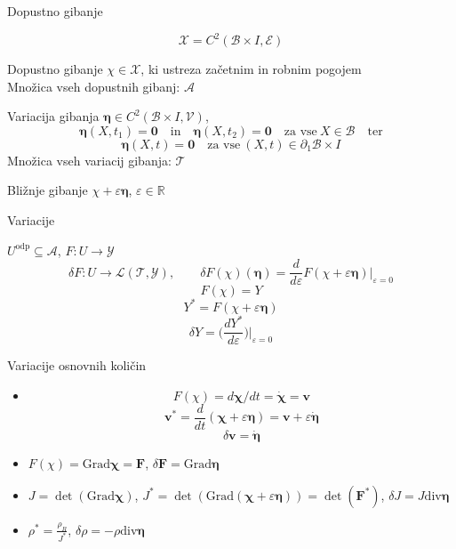 \documentclass{beamer}
\newcommand{\R}{\mathbb R} %
\newcommand{\E}{\mathscr E} %
\newcommand{\V}{\mathscr V} %
\renewcommand{\L}{\mathscr L} %
\newcommand{\B}{\mathcal B} %
\newcommand{\vek}[1]{\boldsymbol #1} %
\newcommand{\ten}[1]{\mathbf #1} %
\renewcommand{\div}{\mathrm{div}} %
\newcommand{\Grad}{\mathrm{Grad}} %
\newcommand{\at}[2]{#1\Big|_{#2}} %
\begin{document}
\begin{frame}{Dopustno gibanje}

\[ \mathcal{X}=C^2(\B\times I,\E) \]
\begin{block}{Dopustno gibanje}
	$\chi\in\mathcal{X}$, ki ustreza začetnim in robnim pogojem\\
	Množica vseh dopustnih gibanj: $\mathcal{A}$
\end{block}

\begin{block}{Variacija gibanja}
	$\vek{\eta}\in C^2(\B\times I,\V)$,
	\[
		\vek{\eta}(X,t_1)=\vek{0}\quad \textrm{in} \quad
		\vek{\eta}(X,t_2)=\vek{0}\quad \textrm{za vse}\ X\in \B\quad\textrm{ter}
	\]
	\[
		\vek{\eta}(X,t)=\vek{0}\quad \textrm{za vse}\ (X,t)\in \partial_1 \B\times I
	\]
	Množica vseh variacij gibanja: $\mathcal{T}$
\end{block}

\begin{block}{Bližnje gibanje}
	$\chi+\varepsilon\vek{\eta}$, $\varepsilon\in\R$
\end{block}

\end{frame}


\begin{frame}{Variacije}

$U^{\mathrm{odp}}\subseteq\mathcal{A}$, $F\colon U\to\mathcal{Y}$
\[
	\delta F\colon U\to\L(\mathcal{T},\mathcal{Y}),\qquad
	\delta F(\chi)(\vek{\eta})=\at{\frac{d}{d\varepsilon}F(\chi+\varepsilon\vek{\eta})}{\varepsilon=0}
\]
\[ F(\chi)=Y \]
\[ Y^*=F(\chi+\varepsilon\vek{\eta}) \]
\[ \delta Y = \at{\Big(\frac{dY^*}{d\varepsilon}\Big)}{\varepsilon=0} \]

\end{frame}


\begin{frame}{Variacije osnovnih količin}

\begin{itemize}

\item
\[ F(\chi)=d\vek{\chi}/dt=\dot{\vek{\chi}}=\vek{v} \]
\[ \vek{v}^*=\frac{d}{dt}(\vek{\chi}+\varepsilon\vek{\eta})=\vek{v}+\varepsilon\dot{\vek{\eta}} \]
\[ \delta\vek{v}=\dot{\vek{\eta}} \]

\item
$F(\chi)=\Grad{\vek{\chi}}=\ten{F}$, $\delta\ten{F}=\Grad\vek{\eta}$

\item
$J=\det(\Grad\vek{\chi})$, $J^*=\det(\Grad(\vek{\chi}+\varepsilon\vek{\eta}))=\det(\ten{F}^*)$,
$\delta J=J\div\vek{\eta}$

\item
$\rho^*=\frac{\rho_R}{J^*}$, $\delta\rho=-\rho\div\vek{\eta}$

\end{itemize}

\end{frame}
\end{document}
